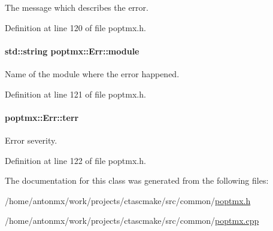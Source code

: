 The message which describes the error. 



Definition at line 120 of file poptmx.h.

\hypertarget{classpoptmx_1_1Err_a8a9576733b21c666d739a2b97aa2fa93}{
\paragraph[{module}]{\setlength{\rightskip}{0pt plus 5cm}std::string {\bf poptmx::Err::module}}\hfill}
\label{classpoptmx_1_1Err_a8a9576733b21c666d739a2b97aa2fa93}


Name of the module where the error happened. 



Definition at line 121 of file poptmx.h.

\hypertarget{classpoptmx_1_1Err_a0eea8ad1572c999136c138d60bb0d225}{
\paragraph[{terr}]{ {\bf poptmx::Err::terr}}\hfill}
\label{classpoptmx_1_1Err_a0eea8ad1572c999136c138d60bb0d225}


Error severity. 



Definition at line 122 of file poptmx.h.



The documentation for this class was generated from the following files:\begin{DoxyCompactItemize}
\item 
/home/antonmx/work/projects/ctascmake/src/common/\hyperlink{poptmx_8h}{poptmx.h}\item 
/home/antonmx/work/projects/ctascmake/src/common/\hyperlink{poptmx_8cpp}{poptmx.cpp}\end{DoxyCompactItemize}
